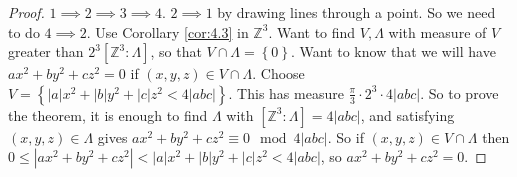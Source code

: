 \documentclass{article}
\newcommand{\Z}{\mathbb{Z}}
\newcommand{\rb}[1]{\left( #1 \right)}
\renewcommand{\sb}[1]{\left[ #1 \right]}
\newcommand{\cb}[1]{\left\{ #1 \right\}}
\newcommand{\abs}[1]{\left\lvert #1 \right\rvert}
\theoremstyle{definition}\newtheorem{definition}{Definition}[section]
\theoremstyle{definition}\newtheorem{remark}[definition]{Remark}
\theoremstyle{definition}\newtheorem*{example}{Example}
\theoremstyle{definition}\newtheorem*{note}{Note}
\begin{document}
\begin{proof}
$ 1 \implies 2 \implies 3 \implies 4 $. $ 2 \implies 1 $ by drawing lines through a point. So we need to do $ 4 \implies 2 $. Use Corollary \ref{cor:4.3} in $ \Z^3 $. Want to find $ V, \Lambda $ with measure of $ V $ greater than $ 2^3\sb{\Z^3 : \Lambda} $, so that $ V \cap \Lambda = \cb{0} $. Want to know that we will have $ ax^2 + by^2 + cz^2 = 0 $ if $ \rb{x, y, z} \in V \cap \Lambda $. Choose $ V = \cb{\abs{a}x^2 + \abs{b}y^2 + \abs{c}z^2 < 4\abs{abc}} $. This has measure $ \tfrac{\pi}{3} \cdot 2^3 \cdot 4\abs{abc} $. So to prove the theorem, it is enough to find $ \Lambda $ with $ \sb{\Z^3 : \Lambda} = 4\abs{abc} $, and satisfying $ \rb{x, y, z} \in \Lambda $ gives $ ax^2 + by^2 + cz^2 \equiv 0 \mod 4\abs{abc} $. So if $ \rb{x, y, z} \in V \cap \Lambda $ then $ 0 \le \abs{ax^2 + by^2 + cz^2} < \abs{a}x^2 + \abs{b}y^2 + \abs{c}z^2 < 4\abs{abc} $, so $ ax^2 + by^2 + cz^2 = 0 $.
\end{proof}
\end{document}
